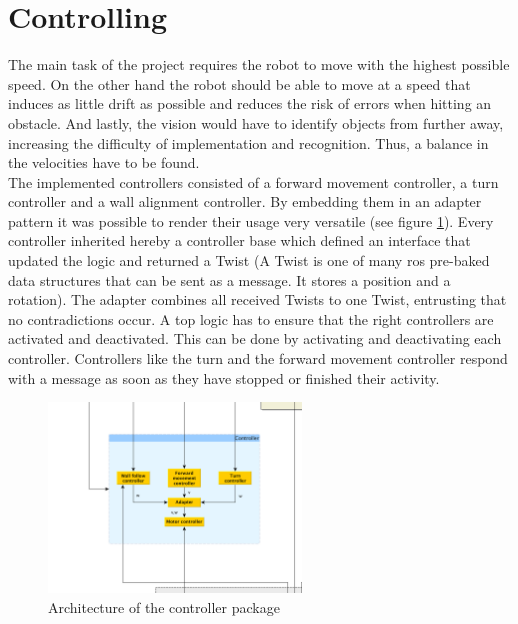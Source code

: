 \section{Controlling}

The main task of the project requires the robot to move with the highest possible speed.
On the other hand the robot should be able to move at a speed that induces as little drift as possible and reduces the risk of errors when hitting an obstacle.
And lastly, the vision would have to identify objects from further away, increasing the difficulty of implementation and recognition.
Thus, a balance in the velocities have to be found.\\

The implemented controllers consisted of a forward movement controller, a turn controller and a wall alignment controller.
By embedding them in an adapter pattern it was possible to render their usage very versatile (see figure \ref{fig:arch_controller}).
Every controller inherited hereby a controller base which defined an interface that updated the logic and returned a Twist
(A Twist is one of many ros pre-baked data structures that can be sent as a message. 
It stores a position and a rotation). 
The adapter combines all received Twists to one Twist, entrusting that no contradictions occur.
A top logic has to ensure that the right controllers are activated and deactivated.
This can be done by activating and deactivating each controller.
Controllers like the turn and the forward movement controller respond with a message as soon as they have stopped or finished their activity.\\

\begin{figure}[h]
\begin{center}
\includegraphics[width=0.6\textwidth]{figures/arch_controller.png}
\end{center}
\caption{Architecture of the controller package}
\label{fig:arch_controller}
\end{figure}

